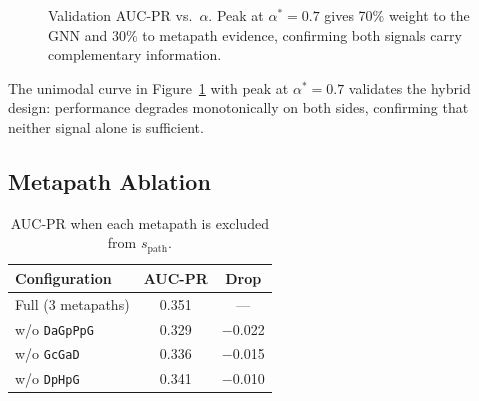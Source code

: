 \documentclass[10pt,a4paper,twocolumn]{article}
\begin{document}
\begin{figure}[H]
\centering
{}
\caption{Validation AUC-PR vs.\ $\alpha$. Peak at $\alpha^*=0.7$ gives 70\%
weight to the GNN and 30\% to metapath evidence, confirming both signals carry
complementary information.}
\label{fig:alpha}
\end{figure}

The unimodal curve in Figure~\ref{fig:alpha} with peak at $\alpha^*=0.7$
validates the hybrid design: performance degrades monotonically on both sides,
confirming that neither signal alone is sufficient.

\subsection{Metapath Ablation}

\begin{table}[H]
\centering\scriptsize
\caption{AUC-PR when each metapath is excluded from $s_\text{path}$.}
\label{tab:ablation}
\setlength{\tabcolsep}{5pt}
\begin{tabular}{lcc}
\toprule
\textbf{Configuration} & \textbf{AUC-PR} & \textbf{Drop} \\
\midrule
Full (3 metapaths)   & 0.351 & --- \\
w/o \texttt{DaGpPpG} & 0.329 & $-$0.022 \\
w/o \texttt{GcGaD}   & 0.336 & $-$0.015 \\
w/o \texttt{DpHpG}   & 0.341 & $-$0.010 \\
\bottomrule
\end{tabular}
\end{table}
\end{document}
